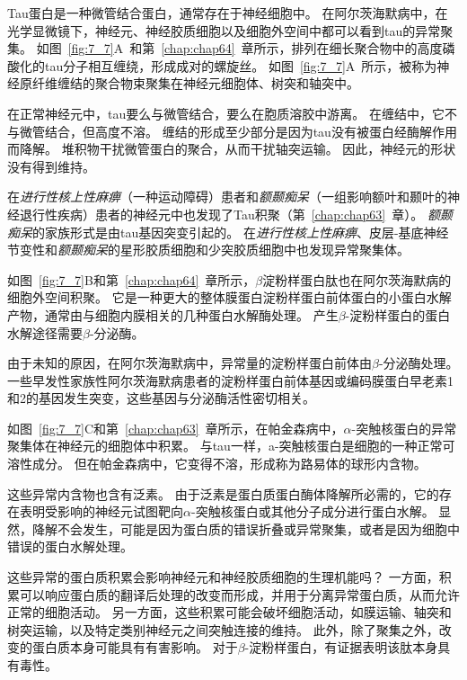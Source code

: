 \begin{proposition}[蛋白质的异常积累是许多神经系统疾病的标志] \label{box:7_1}
	
	\quad \quad Tau蛋白是一种微管结合蛋白，通常存在于神经细胞中。
	在阿尔茨海默病中，在光学显微镜下，神经元、神经胶质细胞以及细胞外空间中都可以看到tau的异常聚集。
	如图~\ref{fig:7_7}A~和第~\ref{chap:chap64}~章所示，排列在细长聚合物中的高度磷酸化的tau分子相互缠绕，形成成对的螺旋丝。
	如图~\ref{fig:7_7}A~所示，被称为神经原纤维缠结的聚合物束聚集在神经元细胞体、树突和轴突中。
	
	\quad \quad 在正常神经元中，tau要么与微管结合，要么在胞质溶胶中游离。
	在缠结中，它不与微管结合，但高度不溶。
	缠结的形成至少部分是因为tau没有被蛋白经酶解作用而降解。
	堆积物干扰微管蛋白的聚合，从而干扰轴突运输。
	因此，神经元的形状没有得到维持。
	
	\quad \quad 在\textit{进行性核上性麻痹}（一种运动障碍）患者和\textit{额颞痴呆}（一组影响额叶和颞叶的神经退行性疾病）患者的神经元中也发现了Tau积聚（第~\ref{chap:chap63}~章）。
	\textit{额颞痴呆}的家族形式是由tau基因突变引起的。
	在\textit{进行性核上性麻痹}、皮层-基底神经节变性和\textit{额颞痴呆}的星形胶质细胞和少突胶质细胞中也发现异常聚集体。
	
	\quad \quad 如图~\ref{fig:7_7}B和第~\ref{chap:chap64}~章所示，$\beta$淀粉样蛋白肽也在阿尔茨海默病的细胞外空间积聚。
	它是一种更大的整体膜蛋白淀粉样蛋白前体蛋白的小蛋白水解产物，通常由与细胞内膜相关的几种蛋白水解酶处理。
	产生$\beta$-淀粉样蛋白的蛋白水解途径需要$\beta$-分泌酶。
	
	\quad \quad 由于未知的原因，在阿尔茨海默病中，异常量的淀粉样蛋白前体由$\beta$-分泌酶处理。
	一些早发性家族性阿尔茨海默病患者的淀粉样蛋白前体基因或编码膜蛋白早老素1和2的基因发生突变，这些基因与分泌酶活性密切相关。
	
	\quad \quad 如图~\ref{fig:7_7}C和第~\ref{chap:chap63}~章所示，在帕金森病中，$\alpha$-突触核蛋白的异常聚集体在神经元的细胞体中积累。
	与tau一样，a-突触核蛋白是细胞的一种正常可溶性成分。
	但在帕金森病中，它变得不溶，形成称为路易体的球形内含物。
	
	\quad \quad 这些异常内含物也含有泛素。
	由于泛素是蛋白质蛋白酶体降解所必需的，它的存在表明受影响的神经元试图靶向$\alpha$-突触核蛋白或其他分子成分进行蛋白水解。
	显然，降解不会发生，可能是因为蛋白质的错误折叠或异常聚集，或者是因为细胞中错误的蛋白水解处理。
	
	\quad \quad 这些异常的蛋白质积累会影响神经元和神经胶质细胞的生理机能吗？
	一方面，积累可以响应蛋白质的翻译后处理的改变而形成，并用于分离异常蛋白质，从而允许正常的细胞活动。
	另一方面，这些积累可能会破坏细胞活动，如膜运输、轴突和树突运输，以及特定类别神经元之间突触连接的维持。
	此外，除了聚集之外，改变的蛋白质本身可能具有有害影响。
	对于$\beta$-淀粉样蛋白，有证据表明该肽本身具有毒性。
	
\end{proposition}


